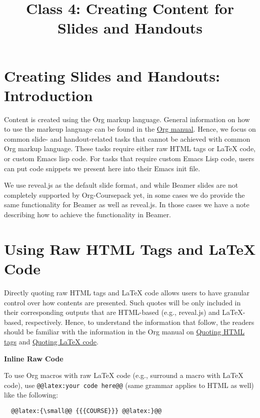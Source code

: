 \documentclass[10pt,article]{article}
\date{\vspace{-6ex}}
\title{Class 4: Creating Content for Slides and Handouts}
\begin{document}
\maketitle
{} 
\thispagestyle{fancy}

\setcounter{tocdepth}{1}
\tableofcontents
\vspace{6ex}

\section{Creating Slides and Handouts: Introduction}
\label{sec:org611f9f9}
Content is created using the Org markup language. General information on how
to use the markeup language can be found in the \href{https://orgmode.org/manual/Markup.html}{Org manual}. Hence,
we focus on common slide- and handout-related tasks that cannot be achieved
with common Org markup language. These tasks require either raw HTML tags or
\LaTeX{} code, or custom Emacs lisp code. For tasks that require custom Emacs
Lisp code, users can put code snippets we present here into their Emacs init
file.

\begin{mdframed}
We use reveal.js as the default slide format, and while Beamer slides are not
completely supported by Org-Coursepack yet, in some cases we do provide the same
functionality for Beamer as well as reveal.js. In those cases we have a
note describing how to achieve the functionality in Beamer.
\end{mdframed}
\section{Using Raw HTML Tags and \LaTeX{} Code}
\label{sec:orgb0bc942}
Directly quoting raw HTML tags and \LaTeX{} code allows users to have granular
control over how contents are presented. Such quotes will be only included in
their corresponding outputs that are HTML-based (e.g., reveal.js) and
\LaTeX{}-based, respectively. Hence, to understand the information that follow,
the readers should be familiar with the information in the Org manual on
\href{https://orgmode.org/manual/Quoting-HTML-tags.html}{Quoting HTML tags} and \href{https://orgmode.org/manual/Quoting-LaTeX-code.html}{Quoting \LaTeX{} code}.

\begin{mdframed}
\textbf{Inline Raw Code}

To use Org macros with raw \LaTeX{} code (e.g., surround a macro with
\LaTeX{} code), use \texttt{@@latex:your code here@@} (same grammar
applies to HTML as well) like the following:

\begin{verbatim}
  @@latex:{\small@@ {{{COURSE}}} @@latex:}@@
\end{verbatim}
\end{mdframed}
\end{document}
